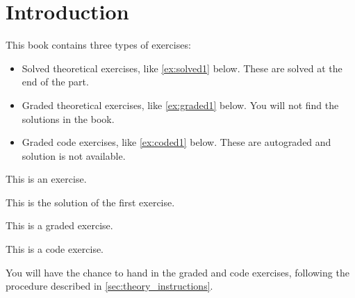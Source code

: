 

\section{Introduction}



This book contains three types of exercises:


\begin{itemize}

  \item Solved theoretical exercises, like \cref{ex:solved1} below. These are solved at the end of the part.
  \item Graded theoretical exercises, like \cref{ex:graded1} below. You will not find the solutions in the book.
  \item Graded code exercises, like \cref{ex:coded1} below. These are autograded and solution is not available.
\end{itemize}


\begin{exercise}
  \label{ex:solved1} This is an exercise.
\end{exercise}
\begin{solution}
  This is the solution of the first exercise.
\end{solution}

\begin{gradedexercise}
  \label{ex:graded1} This is a graded exercise.
\end{gradedexercise}

\begin{codeexercise}
  \label{ex:coded1}
  This is a code exercise.
\end{codeexercise}

You will have the chance to hand in the graded and code exercises, following the procedure described in \cref{sec:theory_instructions}.